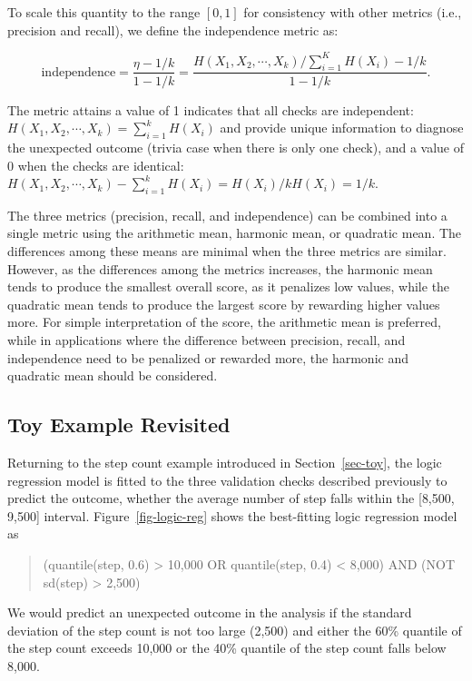 \documentclass[
  12pt,
]{interact}
\begin{document}
To scale this quantity to the range \([0,1]\) for consistency with other
metrics (i.e., precision and recall), we define the independence metric
as:

\[\text{independence} = \frac{\eta - 1/k}{1 - 1/k}= \frac{H(X_1, X_2, \cdots, X_k)/\sum_{i= 1}^K H(X_i) - 1/k}{1 - 1/k}.\]

The metric attains a value of 1 indicates that all checks are
independent: \(H(X_1, X_2, \cdots, X_k)=\sum_{i= 1}^k H(X_i)\) and
provide unique information to diagnose the unexpected outcome (trivia
case when there is only one check), and a value of 0 when the checks are
identical:
\(H(X_1, X_2, \cdots, X_k)- \sum_{i= 1}^k H(X_i) = H(X_i)/ k H(X_i) = 1/k\).

The three metrics (precision, recall, and independence) can be combined
into a single metric using the arithmetic mean, harmonic mean, or
quadratic mean. The differences among these means are minimal when the
three metrics are similar. However, as the differences among the metrics
increases, the harmonic mean tends to produce the smallest overall
score, as it penalizes low values, while the quadratic mean tends to
produce the largest score by rewarding higher values more. For simple
interpretation of the score, the arithmetic mean is preferred, while in
applications where the difference between precision, recall, and
independence need to be penalized or rewarded more, the harmonic and
quadratic mean should be considered.

\subsection{Toy Example Revisited}\label{toy-example-revisited}

Returning to the step count example introduced in Section~\ref{sec-toy},
the logic regression model is fitted to the three validation checks
described previously to predict the outcome, whether the average number
of step falls within the {[}8,500, 9,500{]} interval.
Figure~\ref{fig-logic-reg} shows the best-fitting logic regression model
as

\begin{quote}
(quantile(step, 0.6) \textgreater{} 10,000 OR quantile(step, 0.4)
\textless{} 8,000) AND (NOT sd(step) \textgreater{} 2,500)
\end{quote}

We would predict an unexpected outcome in the analysis if the standard
deviation of the step count is not too large (2,500) and either the 60\%
quantile of the step count exceeds 10,000 or the 40\% quantile of the
step count falls below 8,000.
\end{document}
